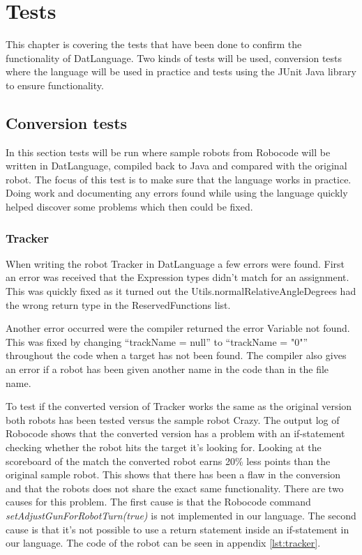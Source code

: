 \chapter{Tests}
This chapter is covering the tests that have been done to confirm the functionality of DatLanguage. Two kinds of tests will be used, conversion tests where the language will be used in practice and tests using the JUnit Java library to ensure functionality.


\section{Conversion tests}
In this section tests will be run where sample robots from Robocode will be written in DatLanguage, compiled back to Java and compared with the original robot. The focus of this test is to make sure that the language works in practice. Doing work and documenting any errors found while using the language quickly helped discover some problems which then could be fixed. 

\subsection{Tracker}
When writing the robot Tracker in DatLanguage a few errors were found. First an error was received that the Expression types didn't match for an assignment. This was quickly fixed as it turned out the Utils.normalRelativeAngleDegrees had the wrong return type in the ReservedFunctions list.

Another error occurred were the compiler returned the error Variable not found. This was fixed by changing “trackName = null” to “trackName = "0"” throughout the code when a target has not been found. The compiler also gives an error if a robot has been given another name in the code than in the file name.

To test if the converted version of Tracker works the same as the original version both robots has been tested versus the sample robot Crazy. The output log of Robocode shows that the converted version has a problem with an if-statement checking whether the robot hits the target it’s looking for. Looking at the scoreboard of the match the converted robot earns 20\% less points than the original sample robot. This shows that there has been a flaw in the conversion and that the robots does not share the exact same functionality.
There are two causes for this problem. The first cause is that the Robocode command \emph{setAdjustGunForRobotTurn(true)} is not implemented in our language. The second cause is that it's not possible to use a return statement inside an if-statement in our language. 
The code of the robot can be seen in appendix \ref{lst:tracker}.


